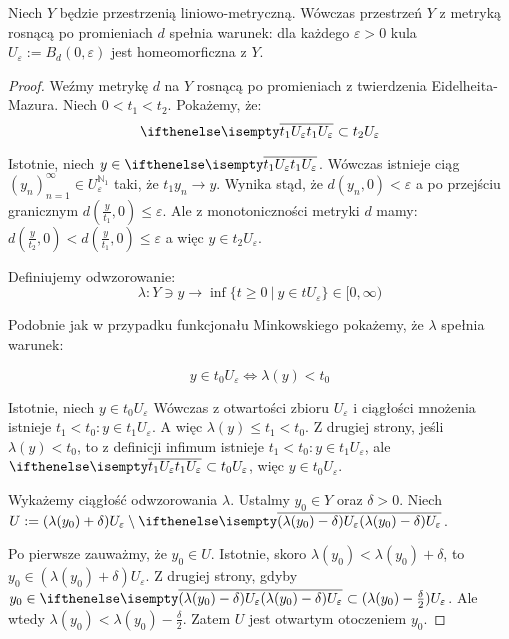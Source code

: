 \begin{lem} \label{lem:ball-homeomorphism}
  Niech $Y$ będzie przestrzenią liniowo-metryczną. Wówczas przestrzeń $Y$ z metryką rosnącą po promieniach $d$ spełnia warunek: dla każdego $\varepsilon > 0$ kula $U_\varepsilon := B_d(0, \varepsilon)$ jest homeomorficzna z $Y$.
  
  \begin{proof}
    Weźmy metrykę $d$ na $Y$ rosnącą po promieniach z twierdzenia Eidelheita-Mazura. Niech $0 < t_1 < t_2$. Pokażemy, że:
    \[
      \cl{t_1 U_\varepsilon} \subset t_2 U_\varepsilon
    \]
    
    Istotnie, niech $y \in \cl{t_1 U_\varepsilon}$. Wówczas istnieje ciąg $(y_n)_{n=1}^\infty \in U_\varepsilon^{\mathbb{N}_1}$ taki, że $t_1 y_n \to y$. Wynika stąd, że $d(y_n, 0) < \varepsilon$ a po przejściu granicznym $d(\frac{y}{t_1}, 0) \leq \varepsilon$. Ale z monotoniczności metryki $d$ mamy: $d(\frac{y}{t_2}, 0) < d(\frac{y}{t_1}, 0) \leq \varepsilon$ a więc $y \in t_2 U_\varepsilon$.
    
    Definiujemy odwzorowanie:
    \[
      \lambda: Y \ni y \to \inf \{t \geq 0\ |\ y \in t U_\varepsilon\} \in [0, \infty)
    \]
    
    Podobnie jak w przypadku funkcjonału Minkowskiego pokażemy, że $\lambda$ spełnia warunek:
    
    \[
      y \in t_0 U_\varepsilon \iff \lambda(y) < t_0
    \]
    
    Istotnie, niech $y \in t_0 U_\varepsilon$
    Wówczas z otwartości zbioru $U_\varepsilon$ i ciągłości mnożenia istnieje $t_1 < t_0: y \in t_1 U_\varepsilon$.
    A więc $\lambda(y) \leq t_1 < t_0$.
    Z drugiej strony, jeśli $\lambda(y) < t_0$, to z definicji infimum istnieje $t_1 < t_0: y \in t_1 U_\varepsilon$, ale $\cl{t_1 U_\varepsilon} \subset t_0 U_\varepsilon$, więc $y \in t_0 U_\varepsilon$.

    Wykażemy ciągłość odwzorowania $\lambda$.
    Ustalmy $y_0 \in Y$ oraz $\delta > 0$.
    Niech $U := (\lambda(y_0) + \delta) U_\varepsilon \setminus \cl{(\lambda(y_0)-\delta) U_\varepsilon}$.
    
    Po pierwsze zauważmy, że $y_0 \in U$.
    Istotnie, skoro $\lambda(y_0) < \lambda(y_0) + \delta$, to $y_0 \in (\lambda(y_0) + \delta) U_\varepsilon$.
    Z drugiej strony, gdyby $y_0 \in \cl{(\lambda(y_0) - \delta) U_\varepsilon} \subset (\lambda(y_0) - \frac{\delta}{2}) U_\varepsilon$. Ale wtedy $\lambda(y_0) < \lambda(y_0) - \frac{\delta}{2}$.
    Zatem $U$ jest otwartym otoczeniem $y_0$.
    

\end{proof}
\end{lem}
